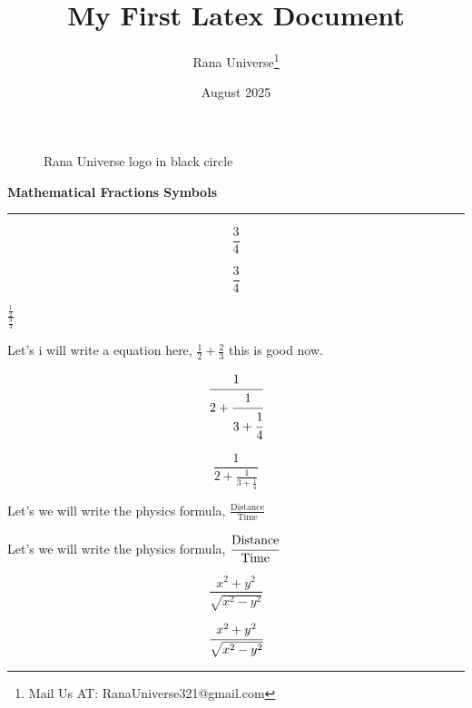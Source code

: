 \documentclass[12pt, letterpaper]{article}
\title{My First Latex Document}
\author{Rana Universe\thanks{Mail Us AT: RanaUniverse321@gmail.com}}
\date{August 2025}
\begin{document}
\maketitle






\begin{figure}[htbp]
\centering


\caption{Rana Universe logo in black circle}

\label{fig:rana-universe-logo}

\end{figure}


\newpage

\begin{center}
    \Huge\textbf{Mathematical Fractions Symbols}
\end{center}

\noindent\rule{\linewidth}{5pt}

\[
\frac{3}{4}
\]

$$
\frac{3}{4}
$$

$\frac{\frac{1}{2}}{\frac{3}{4}}$

Let's i will write a equation here, $\tfrac{1}{2} + \tfrac{2}{3}$ this is good now.


\[
\cfrac{1}{2 + \cfrac{1}{3 + \cfrac{1}{4}}}
\]


\[
\frac{1}{2 + \frac{1}{3 + \frac{1}{4}}}
\]

Let's we will write the physics formula, $\frac{\text{Distance}}{\text{Time}}$

Let's we will write the physics formula, $\cfrac{\text{Distance}}{\text{Time}}$

\[
\frac{x^2 + y^2}{\sqrt{x^2 - y^2}}
\]

\[
\cfrac{x^2 + y^2}{\sqrt{x^2 - y^2}}
\]
\end{document}
